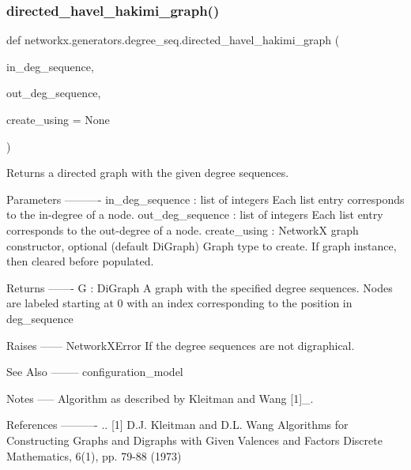 \mbox{\label{namespacenetworkx_1_1generators_1_1degree__seq_a894fdb352d8c1e8aae86009fc66a6443}} 
\subsubsection{\texorpdfstring{directed\+\_\+havel\+\_\+hakimi\+\_\+graph()}{directed\_havel\_hakimi\_graph()}}
{\footnotesize\ttfamily def networkx.\+generators.\+degree\+\_\+seq.\+directed\+\_\+havel\+\_\+hakimi\+\_\+graph (\begin{DoxyParamCaption}\item[{}]{in\+\_\+deg\+\_\+sequence,  }\item[{}]{out\+\_\+deg\+\_\+sequence,  }\item[{}]{create\+\_\+using = {\ttfamily None} }\end{DoxyParamCaption})}

\begin{DoxyVerb}Returns a directed graph with the given degree sequences.

Parameters
----------
in_deg_sequence :  list of integers
    Each list entry corresponds to the in-degree of a node.
out_deg_sequence : list of integers
    Each list entry corresponds to the out-degree of a node.
create_using : NetworkX graph constructor, optional (default DiGraph)
    Graph type to create. If graph instance, then cleared before populated.

Returns
-------
G : DiGraph
    A graph with the specified degree sequences.
    Nodes are labeled starting at 0 with an index
    corresponding to the position in deg_sequence

Raises
------
NetworkXError
    If the degree sequences are not digraphical.

See Also
--------
configuration_model

Notes
-----
Algorithm as described by Kleitman and Wang [1]_.

References
----------
.. [1] D.J. Kleitman and D.L. Wang
   Algorithms for Constructing Graphs and Digraphs with Given Valences
   and Factors Discrete Mathematics, 6(1), pp. 79-88 (1973)
\end{DoxyVerb}
 \mbox{\label{namespacenetworkx_1_1generators_1_1degree__seq_a3065c6aef50cefb696973b782ec9d10f}} 

